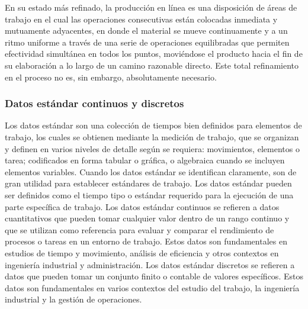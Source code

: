 En su estado más refinado, la producción en línea es una disposición de áreas de trabajo en el cual las operaciones consecutivas están colocadas inmediata y mutuamente adyacentes, en donde el material se mueve continuamente y a un ritmo uniforme a través de una serie de operaciones equilibradas que permiten efectividad simultánea en todos los puntos, moviéndose el producto hacia el fin de su elaboración a lo largo de un camino razonable directo. Este total refinamiento en el proceso no es, sin embargo, absolutamente necesario. \cite{Balanceodelineas}
%
%
\subsubsection{Datos estándar continuos y discretos}

Los datos estándar son una colección de tiempos bien definidos para elementos de trabajo, los cuales se obtienen mediante la medición de trabajo, que se organizan y definen en varios niveles de detalle según se requiera: movimientos, elementos o tarea; codificados en forma tabular o gráfica, o algebraica cuando se incluyen elementos variables. Cuando los datos estándar se identifican claramente, son de gran utilidad para establecer estándares de trabajo. Los datos estándar pueden ser definidos como el tiempo tipo o estándar requerido para la ejecución de una parte específica de trabajo. \cite{Datosestandar}
\newline
Los datos estándar continuos se refieren a datos cuantitativos que pueden tomar cualquier valor dentro de un rango continuo y que se utilizan como referencia para evaluar y comparar el rendimiento de procesos o tareas en un entorno de trabajo. Estos datos son fundamentales en estudios de tiempo y movimiento, análisis de eficiencia y otros contextos en ingeniería industrial y administración.
\newline
Los datos estándar discretos se refieren a datos que pueden tomar un conjunto finito o contable de valores específicos. Estos datos son fundamentales en varios contextos del estudio del trabajo, la ingeniería industrial y la gestión de operaciones.
%
%
